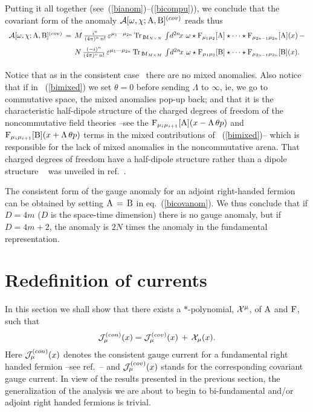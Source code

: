 \documentclass[a4paper,12pt]{article}
\def\cA{{\cal A}}
\def\cJ{{\cal J}}
\def\cX{{\cal X}}
\def\A{{\rm A}}
\def\B{{\rm B}}
\def\F{{\rm F}}
\def\idxn{\int\! d^{2n}\!x \,}
\def\MM{{\rm I\!\!\, M}}
\begin{document}
Putting it all together (see~(\ref{bianom})--(\ref{bicompu})), we conclude that the covariant form of the anomaly
$\cA[\omega,\chi;\A,\B]^{(cov)}$ reads thus
\begin{equation}
\begin{array}{l}
{\cA[\omega,\chi;\A,\B]^{(cov)}\,=\, M\,\frac{i^n}{(4\pi)^n\,n!}\,\varepsilon^{\mu_1\cdots\mu_{2n}}\,
{\rm Tr}_{\,\MM_{N\times N}}\,\idxn\,\omega\star
\F_{\mu_1\mu_2}[\A]\star\cdots\star\F_{\mu_{2n-1}\mu_{2n}}[\A](x)\,-}\\[9pt]
{\phantom{\cA[\omega,\chi;\A,\B]^{(cov)}\,=\,\;}N\,\frac{(-i)^n}{(4\pi)^n\,n!}\,\varepsilon^{\mu_1\cdots\mu_{2n}}\,{\rm Tr}_{\,\MM_{M\times M}}\,\idxn\,\omega\star
\F_{\mu_1\mu_2}[\B]\star\cdots\star\F_{\mu_{2n-1}\mu_{2n}}[\B](x).}\\[9pt]
\end{array}
\label{bicovanom}
\end{equation}
Notice that as in the consistent 
case~\cite{Martin:2000qf, Intriligator:2001yu} there are no
mixed anomalies. Also notice that if in~ (\ref{bimixed}) we set $\theta = 0$ 
before sending $\Lambda$ to $\infty$, ie, we go to commutative space,  
the mixed anomalies pop-up back; and that it is the characteristic  
half-dipole structure of the charged degrees of freedom of the 
noncommutative field theories 
--see the ${\rm F}_{\mu_{i}\mu_{i+1}}[\A](x-\Lambda\,\theta p)$ and 
${\rm F}_{\mu_{i}\mu_{i+1}}[\B](x+\Lambda\,\theta p)$ terms in the mixed contributions of~ (\ref{bimixed})-- which is responsible for 
the lack of mixed anomalies in the noncommutative arena. That charged degrees 
of freedom have a  half-dipole structure rather than a dipole structure
~\cite{Sheikh-Jabbari:1999vm, Bigatti:2000iz}  was 
unveiled in ref.~\cite{Alvarez-Gaume:2001bv}.

  The consistent form of the gauge anomaly for an adjoint right-handed fermion can be obtained by setting $\A\,=\,\B$ in eq.~(\ref{bicovanom}). We thus 
conclude that if $D=4m$ ($D$ is the space-time dimension) there is no gauge anomaly, but if $D=4m+2$, the anomaly is $2N$ times the anomaly in the 
fundamental representation.

\section{Redefinition  of currents}

In this section we shall show that there exists a $*$-polynomial, $\cX^{\mu}$, 
of $\A$ and $\F$, such that 
\begin{equation}
\cJ^{(con)}_{\mu}(x)=\cJ^{(cov)}_{\mu}(x)\,+\,\cX_{\mu}(x).
\label{redefinition}
\end{equation}
Here $\cJ^{(con)}_{\mu}(x)$ denotes the consistent gauge current for a 
fundamental right handed fermion  
--see ref.~\cite{Gracia-Bondia:2000pz, Bonora:2000he, Grisaru:2001sk}-- and
$\cJ^{(cov)}_{\mu}(x)$ stands for the corresponding covariant gauge current. 
In view of the results presented in the previous section,  
the generalization of the analysis we are about to begin to  bi-fundamental and/or adjoint right handed fermions is trivial. 
\end{document}
